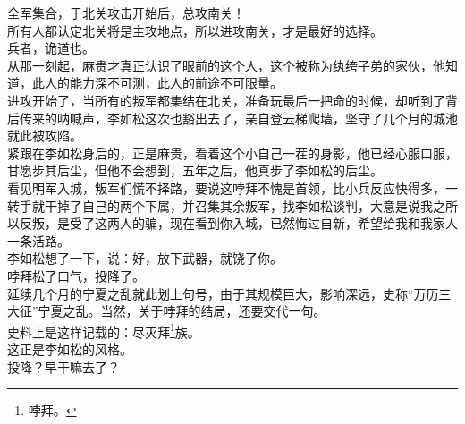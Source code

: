 \begin{multicols}{\theparacolNo}
全军集合，于北关攻击开始后，总攻南关！\\

所有人都认定北关将是主攻地点，所以进攻南关，才是最好的选择。\\

兵者，诡道也。\\

从那一刻起，麻贵才真正认识了眼前的这个人，这个被称为纨绔子弟的家伙，他知道，此人的能力深不可测，此人的前途不可限量。\\

进攻开始了，当所有的叛军都集结在北关，准备玩最后一把命的时候，却听到了背后传来的呐喊声，李如松这次也豁出去了，亲自登云梯爬墙，坚守了几个月的城池就此被攻陷。\\

紧跟在李如松身后的，正是麻贵，看着这个小自己一茬的身影，他已经心服口服，甘愿步其后尘，但他不会想到，五年之后，他真步了李如松的后尘。\\

看见明军入城，叛军们慌不择路，要说这哱拜不愧是首领，比小兵反应快得多，一转手就干掉了自己的两个下属，并召集其余叛军，找李如松谈判，大意是说我之所以反叛，是受了这两人的骗，现在看到你入城，已然悔过自新，希望给我和我家人一条活路。\\

李如松想了一下，说：好，放下武器，就饶了你。\\

哱拜松了口气，投降了。\\

延续几个月的宁夏之乱就此划上句号，由于其规模巨大，影响深远，史称“万历三大征”宁夏之乱。当然，关于哱拜的结局，还要交代一句。\\

史料上是这样记载的：尽灭拜\footnote{哱拜。}族。\\

这正是李如松的风格。\\

投降？早干嘛去了？\\

\ifnum{}
	\end{multicols}
\fi
\newpage


